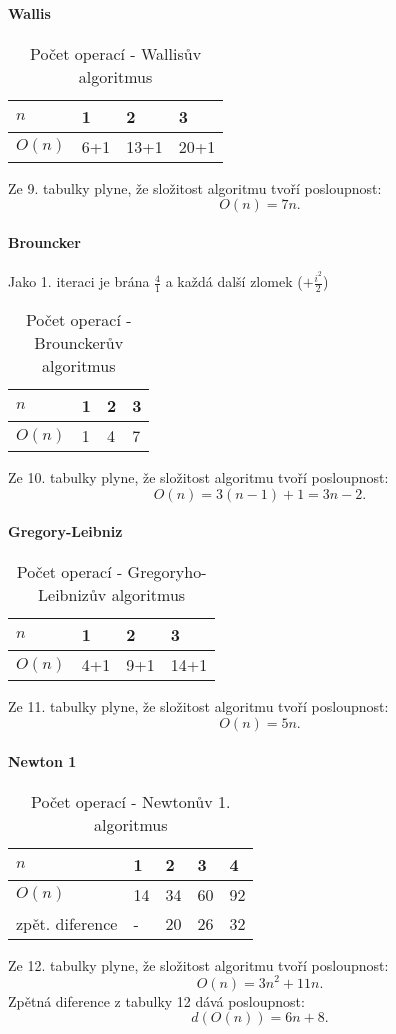 \documentclass[soc]{gzwroc} %
\begin{document}
\paragraph{Wallis}
\begin{table}[h!]
\caption{Počet operací - Wallisův algoritmus}
\begin{tabular}{|l||l|l|l|}
\hline
$n$ & 1&2&3 \\ \hline
$O(n)$&6+1&13+1&20+1 \\ \hline
\end{tabular}
\end{table}
Ze 9. tabulky plyne, že složitost algoritmu tvoří posloupnost:
$$
O(n)=7n.
$$
\paragraph{Brouncker}
Jako 1. iteraci je brána $\frac{4}{1}$ a každá další zlomek ($+\frac{i^2}{2}$)
\begin{table}[h!]
\caption{Počet operací - Brounckerův algoritmus}
\begin{tabular}{|l||l|l|l|}
\hline
$n$ & 1&2&3 \\ \hline
$O(n)$&1&4&7 \\ \hline
\end{tabular}
\end{table}
Ze 10. tabulky plyne, že složitost algoritmu tvoří posloupnost:
$$
O(n)=3(n-1)+1=3n-2.
$$
\paragraph{Gregory-Leibniz}
\begin{table}[h!]
\caption{Počet operací - Gregoryho-Leibnizův algoritmus}
\begin{tabular}{|l||l|l|l|}
\hline
$n$ & 1&2&3 \\ \hline
$O(n)$&4+1&9+1&14+1 \\ \hline
\end{tabular}
\end{table}
Ze 11. tabulky plyne, že složitost algoritmu tvoří posloupnost:
$$
O(n)=5n.
$$
\paragraph{Newton 1}
\begin{table}[h!]
\caption{Počet operací - Newtonův 1. algoritmus}
\begin{tabular}{|l||l|l|l|l|}
\hline
$n$ & 1&2&3&4 \\ \hline
$O(n)$&14&34&60&92 \\ \hline
zpět. diference&-&20&26&32 \\ \hline
\end{tabular}
\end{table}
Ze 12. tabulky plyne, že složitost algoritmu tvoří posloupnost:
$$
O(n)=3n^2+11n.
$$
Zpětná diference z tabulky 12 dává posloupnost:
$$
d(O(n))=6n+8.
$$
\end{document}
